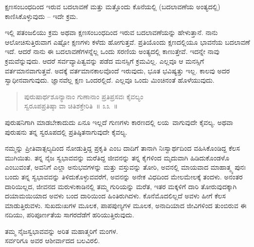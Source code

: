 \vspace{-0.3cm}

ಕ್ಷಣಸಂಬಂಧದಿಂದ ಇರುವ ಬದಲಾವಣೆ ಮತ್ತು ಮತ್ತೊಂದು ಕೊನೆಯಲ್ಲಿ (ಬದಲಾವಣೆಯ ಅಂತ್ಯದಲ್ಲಿ) ಕಾಣಿಸಿಕೊಳ್ಳುವುದು – ಇದೇ ಕ್ರಮ. 

ಇಲ್ಲಿ ಪತಂಜಲಿಯು ಕ್ರಮ ಅಥವಾ ಕ್ಷಣಸಂಬಂಧದಿಂದ ಇರುವ ಬದಲಾವಣೆಯನ್ನು ಹೇಳುತ್ತಾನೆ. ನಾನು ಆಲೋಚಿಸುತ್ತಿರುವಾಗ ಎಷ್ಟೋ ಕ್ಷಣಗಳು ಕಳೆದು ಹೋಗುತ್ತವೆ. ಪ್ರತಿಯೊಂದು ಕ್ಷಣದಲ್ಲಿಯೂ ಭಾವನೆಯ ಬದಲಾವಣೆ ಇದೆ. ಆದರೆ ನಾನು ಈ ಬದಲಾವಣೆಗಳನ್ನೆಲ್ಲ ಒಂದು ಸರಣಿಯ ಅಂತ್ಯದಲ್ಲಿ ಕಾಣುತ್ತೇವೆ. ಇದನ್ನೇ ನಾವು ಕ್ರಮವೆನ್ನುವುದು. ಆದರೆ ಸರ್ವವ್ಯಾಪಿತ್ವವನ್ನು ಪಡೆದ ಮನಸ್ಸಿಗೆ ಕ್ರಮವಿಲ್ಲ. ಎಲ್ಲವೂ ಆ ಮನಸ್ಸಿಗೆ ವರ್ತಮಾನವಾಗುತ್ತವೆ. ಅದಕ್ಕೆ ವರ್ತಮಾನಕಾಲವೊಂದೆ ಇರುವುದು, ಭೂತ ಭವಿಷ್ಯತ್ತು ಇಲ್ಲ. ಕಾಲವು ಅದರ ಸ್ವಾಧೀನವಾಗುವುದು. ಜ್ಞಾನವೆಲ್ಲ ಕ್ಷಣ ಒಂದರಲ್ಲಿದೆ. ಎಲ್ಲವೂ ಒಂದು ಮಿಂಚಿನಂತೆ ಹೊಳೆಯುವುದು.

\begin{verse}
ಪುರುಷಾರ್ಥಶೂನ್ಯಾನಾಂ ಗುಣಾನಾಂ ಪ್ರತಿಪ್ರಸವಃ ಕೈವಲ್ಯಂ \\ಸ್ವರೂಪಪ್ರತಿಷ್ಠಾ ವಾ ಚಿತಿಶಕ್ತೇರಿತಿ~\hfill{॥ ೩೩~॥}
\end{verse}

\vspace{-0.3cm}

ಪುರುಷನಿಗಾಗಿ ಮಾಡಬೇಕಾದುದು ಏನೂ ಇಲ್ಲದೆ ಗುಣಗಳು ಕಾರಣದಲ್ಲಿ ಲಯ\break\ ವಾಗುವುದೇ ಕೈವಲ್ಯ. ಅಥವಾ ಪುರುಷನು ತನ್ನ ಸ್ವರೂಪದಲ್ಲಿ ಪ್ರತಿಷ್ಠಿತನಾಗುವುದೇ ಕೈವಲ್ಯ. 

ನಮ್ಮನ್ನು ಪ್ರೀತಿವಾತ್ಸಲ್ಯದಿಂದ ನೋಡುತ್ತಿದ್ದ ಪ್ರಕೃತಿ ಎಂಬ ದಾದಿಗೆ ತಾನಾಗಿ ನಿಃಸ್ವಾರ್ಥದಿಂದ ವಹಿಸಿಕೊಂಡಿದ್ದ ಕೆಲಸ ಮುಗಿಯಿತು. ತನ್ನ ನೈಜ ಸ್ವಭಾವವನ್ನು ಮರೆತಿದ್ದ ಜೀವನನ್ನು ತನ್ನ ಕೈಗಳಿಂದ ಮೃದುವಾಗಿ ಹಿಡಿದುಕೊಂಡಳೊ ಎಂಬುವಂತೆ, ಅವನಿಗೆ ಎಲ್ಲಾ ಅನುಭವಗಳನ್ನು ಮತ್ತು ವಸ್ತುವನ್ನು ತೋರಿ, ಅವನಲ್ಲಿ ಮಾಯವಾದ ಮಾಹಾತ್ಮ್ಯ ಪುನಃ ಬಂದು ತನ್ನ ಸ್ವಭಾವವನ್ನು ತಿಳಿದುಕೊಳ್ಳುವವರೆಗೆ, ಅವನನ್ನು ಅನೇಕ ವಿಧದಿಂದ ಮೇಲಮೇಲಕ್ಕೆ ತಂದಳು. ಅನಂತರ ದಾರಿಯಿಲ್ಲದ, ಜೀವನದ ಮರುಳುಕಾಡಿನಲ್ಲಿ ತಮ್ಮ ಗುರಿಯನ್ನು ಮರೆತ, ಇತರ ಮಕ್ಕಳಿಗೆ ದಾರಿ ತೋರುವುದಕ್ಕಾಗಿ ದಯಾಮಯಿಯಾದ ಅವಳು ಬಂದ ದಾರಿಯಿಂದ ಹಿಂತಿರುಗಿದಳು. ಕೊನೆಮೊದಲಿಲ್ಲದೆ ಅವಳು ಹೀಗೆ ಕೆಲಸ ಮಾಡುತ್ತಿರುವಳು. ಸುಖದುಃಖಗಳ ಮೂಲಕ, ಪಾಪಪುಣ್ಯಗಳ ಮೂಲಕ, ಅನಾದಿಯಾದ ಜೀವಿಗಳಿಂದ ತುಂಬಿರುವ ಈ ನದಿಯು, ಪರಿಪೂರ್ಣತೆಯ ಸಾಗರದೆಡೆಗೆ ಹರಿಯುತ್ತಿರುವುದು.

\begin{center}
ತಮ್ಮ ನೈಜಸ್ವಭಾವವನ್ನು ಅರಿತ ಮಹಾತ್ಮರಿಗೆ ಮಂಗಳ. \\ ಸರ್ವರಿಗೂ ಅವರ ಆಶೀರ್ವಾದದ ಬಲವಿರಲಿ. 
\end{center}

